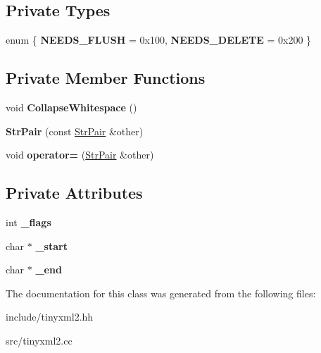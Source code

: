 \subsection*{Private Types}
\begin{DoxyCompactItemize}
\item 
enum \{ {\bfseries N\+E\+E\+D\+S\+\_\+\+F\+L\+U\+SH} = 0x100, 
{\bfseries N\+E\+E\+D\+S\+\_\+\+D\+E\+L\+E\+TE} = 0x200
 \}\hypertarget{classtinyxml2_1_1StrPair_a476a92d76f24486c3ae4731916b12aae}{}\label{classtinyxml2_1_1StrPair_a476a92d76f24486c3ae4731916b12aae}

\end{DoxyCompactItemize}
\subsection*{Private Member Functions}
\begin{DoxyCompactItemize}
\item 
void {\bfseries Collapse\+Whitespace} ()\hypertarget{classtinyxml2_1_1StrPair_ade1469025e6b4cac74397a82a7429337}{}\label{classtinyxml2_1_1StrPair_ade1469025e6b4cac74397a82a7429337}

\item 
{\bfseries Str\+Pair} (const \hyperlink{classtinyxml2_1_1StrPair}{Str\+Pair} \&other)\hypertarget{classtinyxml2_1_1StrPair_ac43c1f4a5730c5582f9cff724376d106}{}\label{classtinyxml2_1_1StrPair_ac43c1f4a5730c5582f9cff724376d106}

\item 
void {\bfseries operator=} (\hyperlink{classtinyxml2_1_1StrPair}{Str\+Pair} \&other)\hypertarget{classtinyxml2_1_1StrPair_a0f095caeacc0b1fd9fee55cd71261ab4}{}\label{classtinyxml2_1_1StrPair_a0f095caeacc0b1fd9fee55cd71261ab4}

\end{DoxyCompactItemize}
\subsection*{Private Attributes}
\begin{DoxyCompactItemize}
\item 
int {\bfseries \+\_\+flags}\hypertarget{classtinyxml2_1_1StrPair_ae6fabc08e7b24b0d41fa5f2fadbda4ed}{}\label{classtinyxml2_1_1StrPair_ae6fabc08e7b24b0d41fa5f2fadbda4ed}

\item 
char $\ast$ {\bfseries \+\_\+start}\hypertarget{classtinyxml2_1_1StrPair_acfd8687916a02833cc55c279460d2f4a}{}\label{classtinyxml2_1_1StrPair_acfd8687916a02833cc55c279460d2f4a}

\item 
char $\ast$ {\bfseries \+\_\+end}\hypertarget{classtinyxml2_1_1StrPair_a855c81f785458d8f84313221f2d4a1eb}{}\label{classtinyxml2_1_1StrPair_a855c81f785458d8f84313221f2d4a1eb}

\end{DoxyCompactItemize}


The documentation for this class was generated from the following files\+:\begin{DoxyCompactItemize}
\item 
include/tinyxml2.\+hh\item 
src/tinyxml2.\+cc\end{DoxyCompactItemize}

